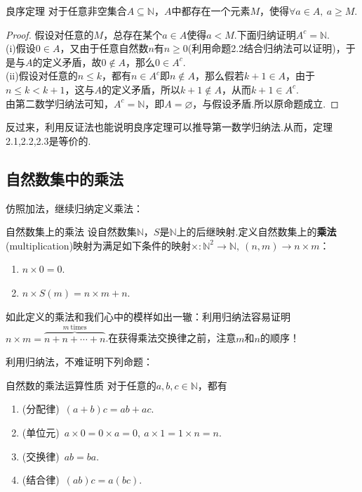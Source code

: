 \documentclass[lang=cn, zihao=5]{elegantbook}
\begin{document}
\begin{theorem}{良序定理}
	对于任意非空集合$A \subseteq \mathbb{N}$，$A$中都存在一个元素$M$，使得$\forall a \in A,~a \geq M$.
\end{theorem}
\begin{proof}
	假设对任意的$M$，总存在某个$a \in A$使得$a < M$.下面归纳证明$A^c = \mathbb{N}$. \\
	(i)假设$0 \in A$，又由于任意自然数$n$有$n \geq 0$(利用命题2.2结合归纳法可以证明)，于是与$A$的定义矛盾，故$0 \notin A$，那么$0 \in A^c$. \\
	(ii)假设对任意的$n \leq k$，都有$n \in A^c$即$n \notin A$，那么假若$k+1 \in A$，由于$n \leq k < k+1$，这与$A$的定义矛盾，所以$k+1 \notin A$，从而$k+1 \in A^c$. \\
	由第二数学归纳法可知，$A^c = \mathbb{N}$，即$A = \varnothing$，与假设矛盾.所以原命题成立.
\end{proof}

反过来，利用反证法也能说明良序定理可以推导第一数学归纳法.从而，定理2.1,2.2,2.3是等价的.

\subsection{自然数集中的乘法}

仿照加法，继续归纳定义乘法：

\begin{definition}{自然数集上的乘法}
	设自然数集$\mathbb{N}$，$S$是$\mathbb{N}$上的后继映射.定义自然数集上的\textbf{乘法}(multiplication)映射为满足如下条件的映射$\times :\mathbb{N}^2 \to \mathbb{N},~(n,m) \to n \times m$：
	\begin{enumerate}
		\item $n\times 0=0$.
		\item $n\times S(m)=n\times m+n$.
	\end{enumerate}
\end{definition}

如此定义的乘法和我们心中的模样如出一辙：利用归纳法容易证明$n \times m = \overbrace{n+n+\cdots +n}^{m~ \text{times}}$.在获得乘法交换律之前，注意$m$和$n$的顺序！

利用归纳法，不难证明下列命题：

\begin{proposition}{自然数的乘法运算性质}
	对于任意的$a,b,c \in \mathbb{N}$，都有
	\begin{enumerate}
		\item (分配律)~$(a+b)c = ab+ac$.
		\item (单位元)~$a \times 0 = 0 \times a = 0,~a \times 1 = 1 \times n = n$.
		\item (交换律)~$ab=ba$.
		\item (结合律)~$(ab)c=a(bc)$.
	\end{enumerate}
\end{proposition}
\end{document}
